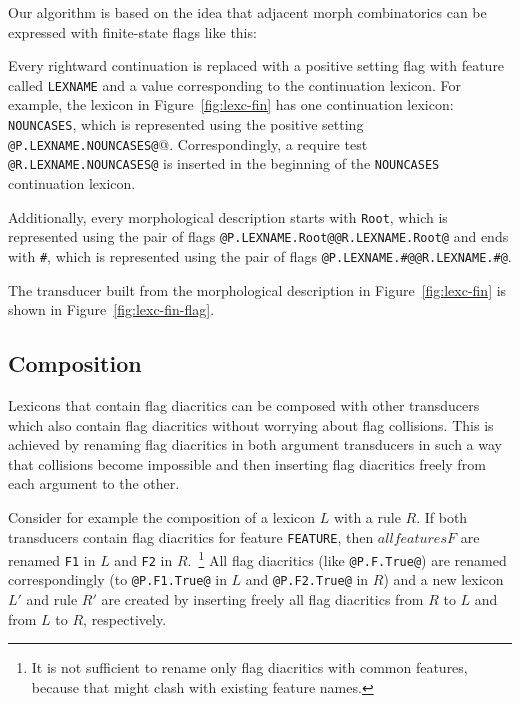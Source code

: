 \documentclass[10pt, a4paper]{article}
\begin{document}
Our algorithm is based on the idea that adjacent morph combinatorics can be expressed with finite-state flags like this:

Every rightward continuation is replaced with a positive setting flag
with feature called \texttt{LEXNAME} and a value corresponding to the
continuation lexicon. For example, the lexicon in
Figure~\ref{fig:lexc-fin} has one continuation lexicon: \texttt{NOUNCASES}, which is represented using the positive setting \verb+@P.LEXNAME.NOUNCASES@+@. Correspondingly, a require test \verb+@R.LEXNAME.NOUNCASES@+ is inserted in the beginning of the \texttt{NOUNCASES} continuation lexicon.

Additionally,
every morphological description starts with \texttt{Root}, which is
represented using the pair of flags
\verb+@P.LEXNAME.Root@@R.LEXNAME.Root@+ and ends with \texttt{\#}, which is represented using the pair of flags \verb+@P.LEXNAME.#@@R.LEXNAME.#@+.

The transducer built from the morphological description in
Figure~\ref{fig:lexc-fin} is shown in Figure~\ref{fig:lexc-fin-flag}.

\subsection{Composition}

Lexicons that contain flag diacritics can be composed with other
transducers which also contain flag diacritics without worrying about
flag collisions. This is achieved by renaming flag diacritics in both
argument transducers in such a way that collisions become impossible
and then inserting flag diacritics freely from each argument to the
other.

Consider for example the composition of a lexicon $L$ with a rule $R$. If
both transducers contain flag diacritics for feature {\tt FEATURE},
then $all features F$ are renamed {\tt F1} in $L$ and {\tt F2} in
$R$.~\footnote{It is not sufficient to rename only flag diacritics
  with common features, because that might clash with existing feature
  names.} All flag diacritics (like {\tt @P.F.True@}) are renamed
correspondingly (to {\tt @P.F1.True@} in $L$ and {\tt @P.F2.True@} in
$R$) and a new lexicon $L'$ and rule $R'$ are created by inserting
freely all flag diacritics from $R$ to $L$ and from $L$ to $R$, respectively.
\end{document}
